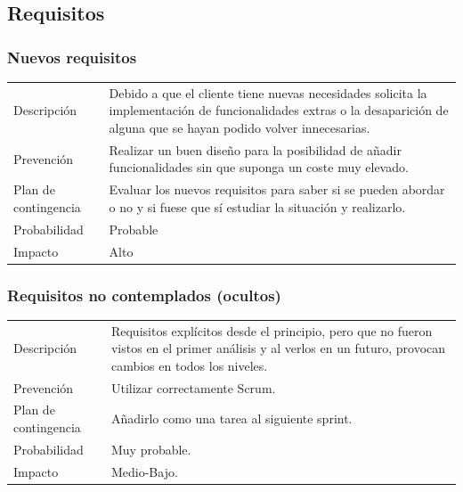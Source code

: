 \subsection{Requisitos}
\subsubsection{Nuevos requisitos}
\begin{table}[H]
    \begin{center}
        \begin{tabular}{l p{8cm}}
            Descripci\'{o}n                 & Debido a que el cliente tiene nuevas necesidades solicita la
            								  implementaci\'{o}n de funcionalidades extras o la desaparici\'{o}n de alguna que se 
            								  hayan podido volver innecesarias. \\
            Prevenci\'{o}n                  & Realizar un buen dise\~{n}o para la posibilidad de añadir
            								  funcionalidades sin que suponga un coste muy elevado. \\ 
            Plan de contingencia            & Evaluar los nuevos requisitos para saber si se pueden
            								  abordar o no y si fuese que s\'i estudiar la situación y realizarlo. \\
            Probabilidad                    & Probable \\
            Impacto                         & Alto \\
        \end{tabular}
    \end{center}
    
\end{table}

\subsubsection{Requisitos no contemplados (ocultos)}
\begin{table}[H]
    \begin{center}
        \begin{tabular}{l p{8cm}}
            Descripci\'{o}n                 & Requisitos explícitos desde el principio, pero que no fueron
            vistos en el primer an\'{a}lisis y al verlos en un futuro, provocan cambios en todos los niveles. \\
            Prevenci\'{o}n                  & Utilizar correctamente Scrum. \\ 
            Plan de contingencia            & A\~{n}adirlo como una tarea al siguiente sprint. \\
            Probabilidad                    & Muy probable. \\
            Impacto                         & Medio-Bajo. \\
        \end{tabular}
    \end{center}
    
\end{table}

